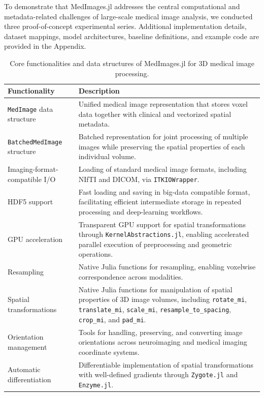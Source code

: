 \documentclass[a4paper,10pt,preprint]{elsarticle}
\begin{document}
To demonstrate that MedImages.jl addresses the central computational and metadata-related challenges of large-scale medical image analysis, we conducted three proof-of-concept experimental series. Additional implementation details, dataset mappings, model architectures, baseline definitions, and example code are provided in the Appendix. 

\begin{table}[H]
\centering
\caption{Core functionalities and data structures of MedImages.jl for 3D medical image processing.}
\label{tab:medimages_functionalities}
\renewcommand{\arraystretch}{1.2}
\begin{tabular}{|p{}|p{}|}
\hline
\textbf{Functionality} & \textbf{Description} \\
\hline
\texttt{MedImage} data structure & Unified medical image representation that stores voxel data together with clinical and vectorized spatial metadata. \\
\hline
\texttt{BatchedMedImage} structure & Batched representation for joint processing of multiple images while preserving the spatial properties of each individual volume. \\
\hline
Imaging-format-compatible I/O & Loading of standard medical image formats, including NIfTI and DICOM, via \texttt{ITKIOWrapper}. \\
\hline
HDF5 support & Fast loading and saving in big-data compatible format, facilitating efficient intermediate storage in repeated processing and deep-learning workflows. \\
\hline
GPU acceleration & Transparent GPU support for spatial transformations through \texttt{KernelAbstractions.jl}, enabling accelerated parallel execution of preprocessing and geometric operations. \\
\hline
Resampling & Native Julia functions for resampling, enabling voxelwise correspondence across modalities. \\
\hline
Spatial transformations & Native Julia functions for manipulation of spatial properties of 3D image volumes, including \texttt{rotate\_mi}, \texttt{translate\_mi}, \texttt{scale\_mi}, \texttt{resample\_to\_spacing}, \texttt{crop\_mi}, and \texttt{pad\_mi}. \\
\hline
Orientation management & Tools for handling, preserving, and converting image orientations across neuroimaging and medical imaging coordinate systems. \\
\hline
Automatic differentiation & Differentiable implementation of spatial transformations with well-defined gradients through \texttt{Zygote.jl} and \texttt{Enzyme.jl}. \\
\hline
\end{tabular}
\end{table}
\end{document}
